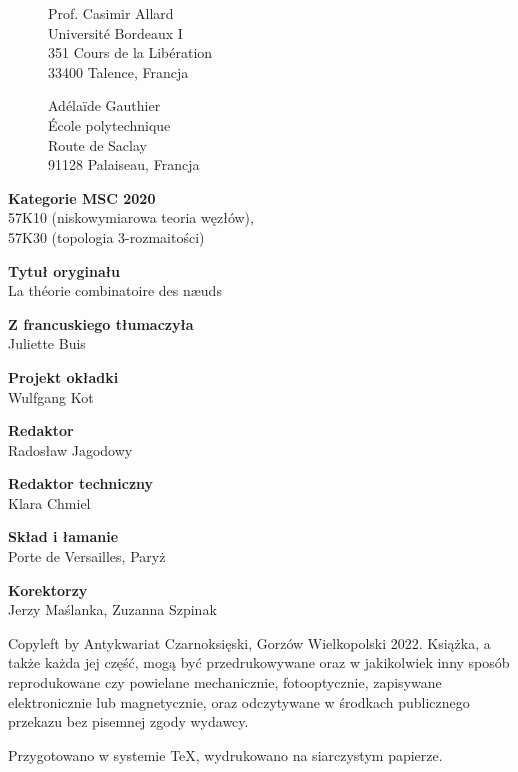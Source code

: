 
\thispagestyle{empty}
\begin{figure}[H]
\begin{minipage}[b]{.48\linewidth}
{\noindent Prof. Casimir Allard\\
Université Bordeaux I\\
351 Cours de la Libération\\
33400 Talence, Francja}
\end{minipage}
\begin{minipage}[b]{.48\linewidth}
{\noindent Adélaïde Gauthier\\
École polytechnique\\
Route de Saclay\\
91128 Palaiseau, Francja}
\end{minipage}
\end{figure}

{\noindent \textbf{Kategorie MSC 2020}\\57K10 (niskowymiarowa teoria węzłów),\\57K30 (topologia 3-rozmaitości)} \vspace{5mm}

{\noindent \textbf{Tytuł oryginału}\\La théorie combinatoire des næuds}
\vspace{5mm}

{\noindent \textbf{Z francuskiego tłumaczyła}\\Juliette Buis} 
\vspace{5mm}

{\noindent \textbf{Projekt okładki}\\Wulfgang Kot}
\vspace{5mm}

{\noindent \textbf{Redaktor}\\Radosław Jagodowy}
\vspace{5mm}

{\noindent \textbf{Redaktor techniczny}\\Klara Chmiel}
\vspace{5mm}

{\noindent \textbf{Skład i łamanie}\\Porte de Versailles, Paryż}
\vspace{5mm}

{\noindent \textbf{Korektorzy}\\Jerzy Maślanka, Zuzanna Szpinak}

\vfill

{\noindent Copyleft by Antykwariat Czarnoksięski, Gorzów Wielkopolski 2022.
Książka, a także każda jej część, mogą być przedrukowywane oraz w jakikolwiek inny sposób reprodukowane czy powielane mechanicznie, fotooptycznie, zapisywane elektronicznie lub magnetycznie, oraz odczytywane w środkach publicznego przekazu bez pisemnej zgody wydawcy.}

\vspace{5mm}

{\noindent Przygotowano w systemie \TeX, wydrukowano na siarczystym papierze.}

